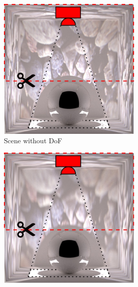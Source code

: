 \begin{figure}[]
    \centering    
    \begin{subfigure}{\textwidth}
        \centering
        \hfill
        \begin{subfigure}{0.32\textwidth}
            \centering
            \includegraphics[width=\textwidth]{images/04-experiment03/dof/scene_highlighted.jpg}
            \caption*{Scene without DoF}
        \end{subfigure}
        \hspace*{0.5mm}
        \begin{subfigure}{0.32\textwidth}
            \centering
            \includegraphics[width=\textwidth]{images/04-experiment03/dof/scene_dof_highlighted.jpg}

\end{subfigure}
\end{subfigure}
\end{figure}
